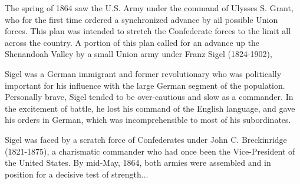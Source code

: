The spring of 1864 saw the U.S. Army under the command of Ulysses S. Grant, who for the first time ordered a synchronized advance by ail possible Union forces. This plan was intended to stretch the Confederate forces to the limit all across the country. A portion of this plan called for an advance up the Shenandoah Valley by a small Union army under Franz Sigel (1824-1902),

Sigel was a German immigrant and former revolutionary who was politically important for his influence with the large German segment of the population. Personally brave, Sigel tended to be over-cautious and slow as a commander. In the excitement of battle, he lost his command of the English language, and gave his orders in German, which was incomprehensible to most of his subordinates.

Sigel was faced by a scratch force of Confederates under John C. Breckinridge (1821-1875), a charismatic commander who had once been the Vice-President of the United States. By mid-May, 1864, both armies were assembled and in position for a decisive test of strength...

